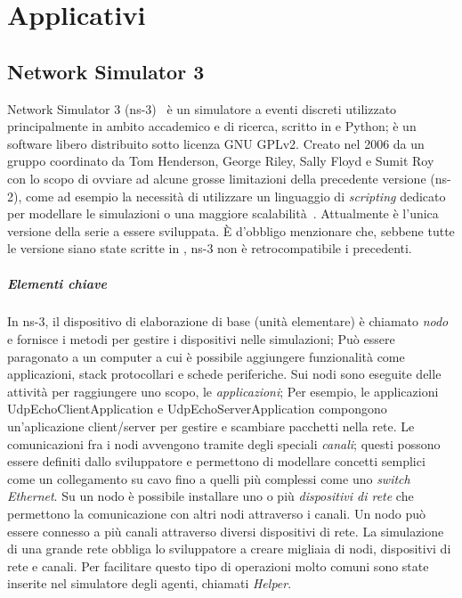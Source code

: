
\chapter{Applicativi}\label{chap:applicativi}
\section{Network Simulator 3}\label{sec:ns-3}
Network Simulator 3 (ns-3)~\cite{ns3Website} è un simulatore a eventi discreti utilizzato principalmente in ambito accademico e di ricerca,
scritto in \Cpp{} e Python; è un software libero distribuito sotto licenza GNU GPLv2.
Creato nel 2006 da un gruppo coordinato da Tom Henderson, George Riley, Sally Floyd e Sumit Roy con lo scopo
di ovviare ad alcune grosse limitazioni della precedente versione (ns-2), come ad esempio la necessità di utilizzare
un linguaggio di \textit{scripting} dedicato per modellare le simulazioni o una maggiore scalabilità~\cite{Henderson:2006:NPG:1190455.1190468}.
Attualmente è l'unica versione della serie a essere sviluppata.
È d'obbligo menzionare che, sebbene tutte le versione siano state scritte in \Cpp, ns-3 non è retrocompatibile i precedenti.
%
%
\paragraph{Elementi chiave}
In ns-3, il dispositivo di elaborazione di base (unità elementare) è chiamato \textit{nodo}
e fornisce i metodi per gestire i dispositivi nelle simulazioni;
Può essere paragonato a un computer a cui è possibile aggiungere funzionalità come applicazioni,
stack protocollari e schede periferiche.
Sui nodi sono eseguite delle attività per raggiungere uno scopo, le \textit{applicazioni};
Per esempio, le applicazioni \textsf{UdpEchoClientApplication} e \textsf{UdpEchoServerApplication} compongono
un'aplicazione client/server per gestire e scambiare pacchetti nella rete.
Le comunicazioni fra i nodi avvengono tramite degli speciali \textit{canali};
questi possono essere definiti dallo sviluppatore e permettono di modellare concetti semplici come un collegamento su cavo
fino a quelli più complessi come uno \textit{switch Ethernet}.
Su un nodo è possibile installare uno o più \textit{dispositivi di rete} che permettono la comunicazione con altri nodi attraverso i canali.
Un nodo può essere connesso a più canali attraverso diversi dispositivi di rete.
La simulazione di una grande rete obbliga lo sviluppatore a creare migliaia di nodi, dispositivi di rete e canali.
Per facilitare questo tipo di operazioni molto comuni sono state inserite nel simulatore degli agenti, chiamati \textit{Helper}.
%
